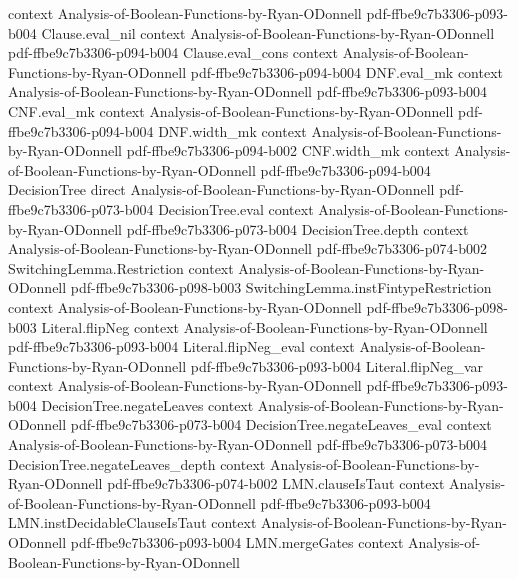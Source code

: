 \begin{theorem}
  {context}
  {Analysis-of-Boolean-Functions-by-Ryan-ODonnell}
  {pdf-ffbe9c7b3306-p093-b004}
\proofstep
  {Clause.eval_nil}
  {context}
  {Analysis-of-Boolean-Functions-by-Ryan-ODonnell}
  {pdf-ffbe9c7b3306-p094-b004}
\proofstep
  {Clause.eval_cons}
  {context}
  {Analysis-of-Boolean-Functions-by-Ryan-ODonnell}
  {pdf-ffbe9c7b3306-p094-b004}
\proofstep
  {DNF.eval_mk}
  {context}
  {Analysis-of-Boolean-Functions-by-Ryan-ODonnell}
  {pdf-ffbe9c7b3306-p093-b004}
\proofstep
  {CNF.eval_mk}
  {context}
  {Analysis-of-Boolean-Functions-by-Ryan-ODonnell}
  {pdf-ffbe9c7b3306-p094-b004}
\proofstep
  {DNF.width_mk}
  {context}
  {Analysis-of-Boolean-Functions-by-Ryan-ODonnell}
  {pdf-ffbe9c7b3306-p094-b002}
\proofstep
  {CNF.width_mk}
  {context}
  {Analysis-of-Boolean-Functions-by-Ryan-ODonnell}
  {pdf-ffbe9c7b3306-p094-b004}
\proofstep
  {DecisionTree}
  {direct}
  {Analysis-of-Boolean-Functions-by-Ryan-ODonnell}
  {pdf-ffbe9c7b3306-p073-b004}
\proofstep
  {DecisionTree.eval}
  {context}
  {Analysis-of-Boolean-Functions-by-Ryan-ODonnell}
  {pdf-ffbe9c7b3306-p073-b004}
\proofstep
  {DecisionTree.depth}
  {context}
  {Analysis-of-Boolean-Functions-by-Ryan-ODonnell}
  {pdf-ffbe9c7b3306-p074-b002}
\proofstep
  {SwitchingLemma.Restriction}
  {context}
  {Analysis-of-Boolean-Functions-by-Ryan-ODonnell}
  {pdf-ffbe9c7b3306-p098-b003}
\proofstep
  {SwitchingLemma.instFintypeRestriction}
  {context}
  {Analysis-of-Boolean-Functions-by-Ryan-ODonnell}
  {pdf-ffbe9c7b3306-p098-b003}
\proofstep
  {Literal.flipNeg}
  {context}
  {Analysis-of-Boolean-Functions-by-Ryan-ODonnell}
  {pdf-ffbe9c7b3306-p093-b004}
\proofstep
  {Literal.flipNeg_eval}
  {context}
  {Analysis-of-Boolean-Functions-by-Ryan-ODonnell}
  {pdf-ffbe9c7b3306-p093-b004}
\proofstep
  {Literal.flipNeg_var}
  {context}
  {Analysis-of-Boolean-Functions-by-Ryan-ODonnell}
  {pdf-ffbe9c7b3306-p093-b004}
\proofstep
  {DecisionTree.negateLeaves}
  {context}
  {Analysis-of-Boolean-Functions-by-Ryan-ODonnell}
  {pdf-ffbe9c7b3306-p073-b004}
\proofstep
  {DecisionTree.negateLeaves_eval}
  {context}
  {Analysis-of-Boolean-Functions-by-Ryan-ODonnell}
  {pdf-ffbe9c7b3306-p073-b004}
\proofstep
  {DecisionTree.negateLeaves_depth}
  {context}
  {Analysis-of-Boolean-Functions-by-Ryan-ODonnell}
  {pdf-ffbe9c7b3306-p074-b002}
\proofstep
  {LMN.clauseIsTaut}
  {context}
  {Analysis-of-Boolean-Functions-by-Ryan-ODonnell}
  {pdf-ffbe9c7b3306-p093-b004}
\proofstep
  {LMN.instDecidableClauseIsTaut}
  {context}
  {Analysis-of-Boolean-Functions-by-Ryan-ODonnell}
  {pdf-ffbe9c7b3306-p093-b004}
\proofstep
  {LMN.mergeGates}
  {context}
  {Analysis-of-Boolean-Functions-by-Ryan-ODonnell}

\end{theorem}
